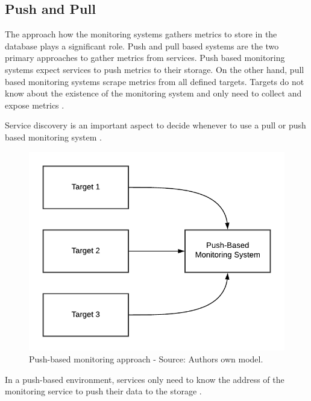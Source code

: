 \subsection{Push and Pull}
\label{subsec:02_monitoring_push-pull}
The approach how the monitoring systems gathers metrics to store in the database plays a significant role.
Push and pull based systems are the two primary approaches to gather metrics from services.
Push based monitoring systems expect services to push metrics to their storage.
On the other hand, pull based monitoring systems scrape metrics from all defined targets. Targets do not know about the existence of the monitoring system and only need to collect and expose metrics \cite{Farcic2017Toolkit21}.


Service discovery is an important aspect to decide whenever to use a pull or push based monitoring system \cite{Farcic2017Toolkit21}.

\begin{figure}[h]
\centering
\includegraphics[scale=0.8]{images/02_theoretical_foundation/monitoring/push_based}
\caption{Push-based monitoring approach - Source: Authors own model.}
\label{fig:mon_push-based}
\end{figure}
In a push-based environment, services only need to know the address of the monitoring service to push their data to the storage \cite{Farcic2017Toolkit21}.


